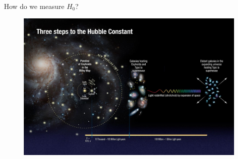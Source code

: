 \documentclass{beamer}
\begin{document}
\begin{frame}{How do we measure $H_0$?}
\begin{figure}[hbtp]
\centering
\includegraphics[width=\textwidth]{../figures/chapter-h0/hubblefindsu.jpg}
\end{figure}

\end{frame}
\end{document}
